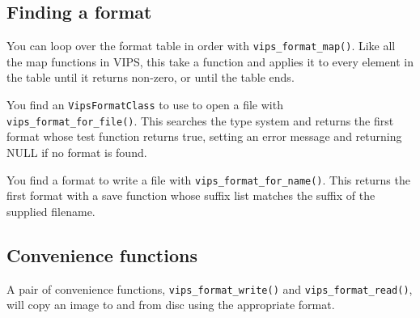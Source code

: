 \subsection{Finding a format}

You can loop over the format table in order with \verb+vips_format_map()+. Like
all the map functions in VIPS, this take a function and applies it to every
element in the table until it returns non-zero, or until the table ends. 

You find an \verb+VipsFormatClass+ to use to open a file with
\verb+vips_format_for_file()+. This searches the type system and returns
the first format whose test function returns true, setting an error message
and returning NULL if no format is found.

You find a format to write a file with \verb+vips_format_for_name()+. This
returns the first format with a save function whose suffix list matches the
suffix of the supplied filename.

\subsection{Convenience functions}

A pair of convenience functions, \verb+vips_format_write()+ and
\verb+vips_format_read()+, will copy an image to and from disc using the
appropriate format.
